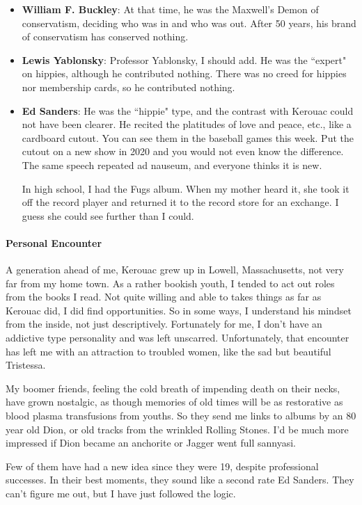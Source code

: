 \begin{itemize}
\item \textbf{William F. Buckley}: At that time, he was the Maxwell's Demon of conservatism, deciding who was in and who was out. After 50 years, his brand of conservatism has conserved nothing. 
\item \textbf{Lewis Yablonsky}: Professor Yablonsky, I should add. He was the ``expert" on hippies, although he contributed nothing. There was no creed for hippies nor membership cards, so he contributed nothing. 
\item \textbf{Ed Sanders}: He was the ``hippie" type, and the contrast with Kerouac could not have been clearer. He recited the platitudes of love and peace, etc., like a cardboard cutout. You can see them in the baseball games this week. Put the cutout on a new show in 2020 and you would not even know the difference. The same speech repeated ad nauseum, and everyone thinks it is new.

In high school, I had the Fugs album. When my mother heard it, she took it off the record player and returned it to the record store for an exchange. I guess she could see further than I could. 
\end{itemize}
\paragraph{Personal Encounter}
A generation ahead of me, Kerouac grew up in Lowell, Massachusetts, not very far from my home town. As a rather bookish youth, I tended to act out roles from the books I read. Not quite willing and able to takes things as far as Kerouac did, I did find opportunities. So in some ways, I understand his mindset from the inside, not just descriptively. Fortunately for me, I don't have an addictive type personality and was left unscarred. Unfortunately, that encounter has left me with an attraction to troubled women, like the sad but beautiful Tristessa.

My boomer friends, feeling the cold breath of impending death on their necks, have grown nostalgic, as though memories of old times will be as restorative as blood plasma transfusions from youths. So they send me links to albums by an 80 year old Dion, or old tracks from the wrinkled Rolling Stones. I'd be much more impressed if Dion became an anchorite or Jagger went full sannyasi.

Few of them have had a new idea since they were 19, despite professional successes. In their best moments, they sound like a second rate Ed Sanders. They can't figure me out, but I have just followed the logic.

